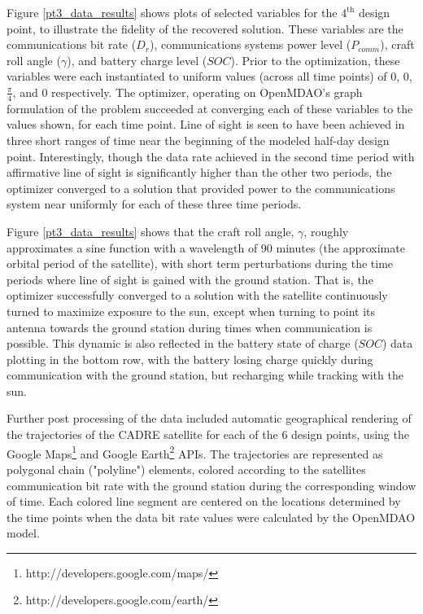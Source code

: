 \documentclass[]{aiaa-tc} %
\begin{document}
Figure \ref{pt3_data_results} shows plots of selected variables for the $4^{\textrm{th}}$ design point,
to illustrate the fidelity of the recovered solution. These variables are the communications bit rate ($D_r$), communications systems power level ($P_{comm}$), craft roll angle ($\gamma$),
and battery charge level ($SOC$). Prior to the optimization, these variables
were each instantiated to uniform values
(across all time points) of 0, 0, $\frac{\pi}{4}$, and 0 respectively. The optimizer, operating on
OpenMDAO's graph formulation of the problem succeeded at converging each of these variables to the values
shown, for each time point. Line of sight is seen to have been achieved in three short ranges of time near the
beginning of the modeled half-day design point. Interestingly, though the data rate achieved in the second
time period with affirmative line of sight is significantly higher than the other two periods, the optimizer
converged to a solution that provided power to the communications system near uniformly for each of these
three time periods.

Figure \ref{pt3_data_results} shows that the craft roll angle, $\gamma$, roughly approximates a sine function
with a wavelength of 90 minutes (the approximate orbital period of the satellite),
with short term perturbations during the time
periods where line of sight is gained with the ground station. That is, the optimizer successfully
converged to a solution with the satellite continuously turned to maximize exposure to the sun,
except when turning to point its antenna towards the ground station during times when
communication is possible. This dynamic is also reflected in the battery state of charge ($SOC$)
data plotting in the bottom row, with the battery losing charge quickly during
communication with the ground station, but recharging while tracking with the sun.

Further post processing of the data included automatic geographical rendering of the trajectories of
the CADRE satellite for each of the 6 design points, using the Google
Maps\footnote{http://developers.google.com/maps/} and Google
Earth\footnote{http://developers.google.com/earth/} APIs. The trajectories are
represented as polygonal chain ("polyline") elements, colored according to the
satellites communication bit rate with the ground station during the corresponding
window of time. Each colored line segment are centered on the locations
determined by the time points when the data bit rate values were calculated
by the OpenMDAO model.
\end{document}
